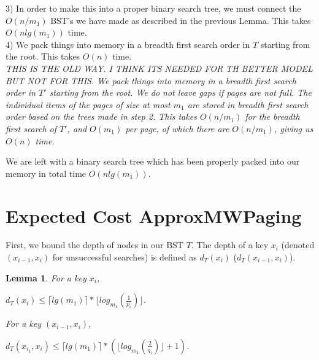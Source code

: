\documentclass[letterpaper,12pt,titlepage,oneside,final]{book}
\theoremstyle{plain}
\newtheorem{lem}[thm]{Lemma}
\begin{document}
3) In order to make this into a proper binary search tree, we must connect the $O(n/m_1)$ BST's we have made as described in the previous Lemma. This takes $O(n lg(m_1))$ time. \\

4) We pack things into memory in a breadth first search order in $T$ starting from the root. This takes $O(n)$ time. \\


\textit{THIS IS THE OLD WAY. I THINK ITS NEEDED FOR TH BETTER MODEL BUT NOT FOR THIS. We pack things into memory in a breadth first search order in $T'$ starting from the root. We do not leave gaps if pages are not full. The individual items of the pages of size at most $m_1$ are stored in breadth first search order based on the trees made in step 2. This takes $O(n/m_1)$ for the breadth first search of $T'$, and $O(m_1)$ per page, of which there are $O(n/m_1)$, giving us $O(n)$ time.\\} 

We are left with a binary search tree which has been properly packed into our memory in total time $O(n lg(m_1))$.

\section{Expected Cost ApproxMWPaging}

First, we bound the depth of nodes in our BST $T$. The depth of a key $x_i$ (denoted $(x_{i-1}, x_i)$ for unsuccessful searches) is defined as $d_T(x_i)$ ($d_T(x_{i-1},x_i)$).

\begin{lem}
For a key $x_i$,
\begin{center} $d_T(x_i) \leq \lceil lg(m_1) \rceil * \lfloor log_{m_1}(\frac{1}{p_i}) \rfloor$. \end{center}
For a key $(x_{i-1},x_i)$,
\begin{center} $d_T(x_{i_1},x_i) \leq \lceil lg(m_1) \rceil * (\lfloor log_{m_1}(\frac{2}{q_i}) \rfloor + 1)$. \end{center}
\end{lem}
\end{document}
